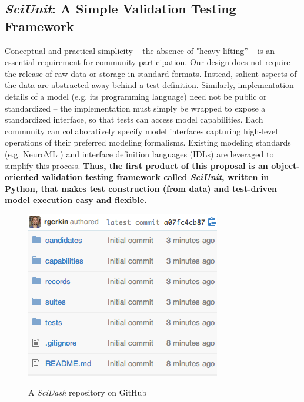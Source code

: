\documentclass[11pt,letterpaper]{article}
\begin{document}
\subsection{\textit{SciUnit}: A Simple Validation Testing Framework}
Conceptual and practical simplicity -- the absence of "heavy-lifting'' -- is an essential requirement for community participation. Our design does not require the release of raw data or storage in standard formats. Instead, salient aspects of the data are abstracted away behind a test definition. Similarly, implementation details of a model (e.g. its programming language) need not be public or standardized -- the implementation must simply be wrapped to expose a standardized interface, so that tests can access model capabilities. Each community can collaboratively specify model interfaces capturing high-level operations of their preferred modeling formalisms. Existing modeling standards (e.g. NeuroML \cite{neuroml_url,gleeson_neuroml:_2010}) and interface definition languages (IDLs) \cite{bachmann2008} are leveraged to simplify this process. \textbf{Thus, the first product of this proposal is an object-oriented validation testing framework called \textit{SciUnit}, written in Python, that makes test construction (from data) and test-driven model execution easy and flexible.} 

\begin{figure}
\centering
\includegraphics[scale=0.7]{scidash_github.png}
\label{fig:scidash_repo}
\caption{A \textit{SciDash} repository on GitHub}
\end{figure}
\leavevmode
{}    
\end{document}
